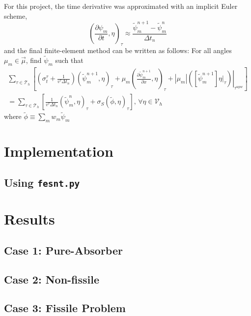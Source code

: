 \documentclass{article}
\newcommand{\mfesv}{\mathcal{V}_h}
\newcommand{\tauh}{\mathcal{T}_h}
\newcommand{\pdiff}[2]{\frac{\partial#1}{\partial#2}}
\newcommand{\ddx}[1]{\pdiff{#1}{x}}
\newcommand{\ddt}[1]{\pdiff{#1}{t}}
\newcommand{\dpmdt}{\ddt{\psi_m}}
\newcommand{\forEtaInV}{,\,\forall\eta\in\mfesv}
\newcommand{\sumTaus}{\sum_{\tauinT}}
\newcommand{\tfem}{finite-element method }
\newcommand{\tauinT}{\tau\in\tauh}
\newcommand{\fepsim}{\tilde{\psi}_m}
\newcommand{\innerProd}[2]{\left(#1,#2\right)}
\newcommand{\tauInt}[2]{\innerProd{#1}{#2}_\tau}
\newcommand{\inTau}[1]{\left.#1\right\vert_{\tau}}
\newcommand{\fephi}{\tilde{\phi}}
\newcommand{\mabs}[1]{\left|#1\right|}
\newcommand{\jump}[1]{\left[#1\right]}
\begin{document}
For this project, the time derivative was approximated with an implicit Euler scheme, 
\begin{equation}
    \label{eq:timeDeriv}
    \tauInt{\dpmdt}{\eta}\approx\frac{\fepsim^{n+1}-\fepsim^n}{\Delta t_n}
\end{equation}
and the final \tfem can be written as follows: For all angles $\mu_m\in\vec{\mu}$, find $\fepsim$ such that
\begin{equation}
    \label{eq:finalFEM}
    \begin{split}
        \sumTaus\left[
            \left(\sigma_t^\tau+\frac{1}{v^\tau\Delta t_n}\right)\tauInt{\fepsim^{n+1}}{\eta}
            +\mu_m\tauInt{\ddx{\fepsim^{n+1}}}{\eta}
            +\mabs{\mu_m}\left.\left(\jump{\fepsim^{n+1}}\inTau{\eta}\right)\right|_{\tau^{upw}}
            \right] \\
        = \sumTaus\left[
            \frac{1}{v^\tau\Delta t_n}\tauInt{\fepsim^n}{\eta}
            +\sigma_S\tauInt{\fephi}{\eta}
            \right]
        \forEtaInV
    \end{split}
\end{equation}
where $\fephi\equiv\sum_mw_m\fepsim$
\section{Implementation} \label{sec:implement}

\subsection{Using \texttt{fesnt.py}} \label{sec:usage}

\section{Results} \label{sec:results}

\subsection{Case 1: Pure-Absorber} \label{sec:pa}

\subsection{Case 2: Non-fissile} \label{sec:nonFissile}

\subsection{Case 3: Fissile Problem} \label{sec:fissile}
\end{document}
